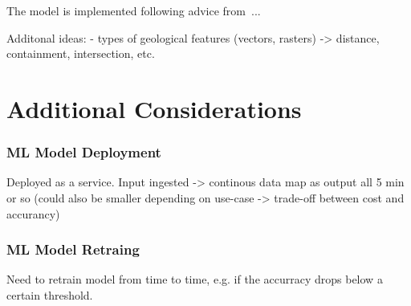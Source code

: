 The model is implemented following advice from~\cite{rey2023geographic}...

Additonal ideas:
- types of geological features (vectors, rasters) -> distance, containment, intersection, etc. 

\section{Additional Considerations}

\subsubsection{ML Model Deployment}
Deployed as a service. Input ingested -> continous data map as output all 5 min or so (could also be smaller depending on use-case -> trade-off between cost and accurancy)

\subsubsection{ML Model Retraing}
Need to retrain model from time to time, e.g. if the accurracy drops below a certain threshold.
